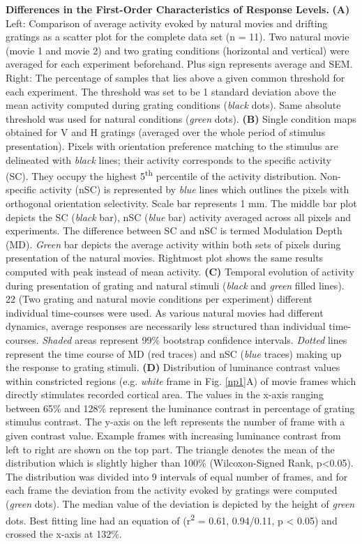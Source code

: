\textbf{Differences in the First-Order Characteristics of Response Levels.}
\textbf{(A)} Left: Comparison of average activity evoked by natural movies
and drifting gratings as a scatter plot for the complete data set (n = 11).
Two natural movie (movie 1 and movie 2) and two grating conditions
(horizontal and vertical) were averaged for each experiment beforehand.
Plus sign represents average and SEM. Right: The percentage of samples that
lies above a given common threshold for each experiment. The threshold was
set to be 1 standard deviation above the mean activity computed during
grating conditions (\textit{black} dots). Same absolute threshold was used
for natural conditions (\textit{green} dots).  \textbf{(B)} Single
condition maps obtained for V and H gratings (averaged over the whole
period of stimulus presentation). Pixels with orientation preference
matching to the stimulus are delineated with \textit{black} lines; their
activity corresponds to the specific activity (SC). They occupy the highest
5\textsuperscript{th} percentile of the activity distribution. Non-specific
activity (nSC) is represented by \textit{blue} lines which outlines the
pixels with orthogonal orientation selectivity. Scale bar represents 1 mm.
The middle bar plot depicts the SC (\textit{black} bar), nSC (\textit{blue}
bar) activity averaged across all pixels and experiments. The difference
between SC and nSC is termed Modulation Depth (MD). \textit{Green} bar
depicts the average activity within both sets of pixels during presentation
of the natural movies. Rightmost plot shows the same results computed with
peak instead of mean activity. \textbf{(C)} Temporal evolution of activity
during presentation of grating and natural stimuli (\textit{black} and
\textit{green} filled lines). 22 (Two grating and natural movie conditions
per experiment) different individual time-courses were used. As various
natural movies had different dynamics, average responses are necessarily
less structured than individual time-courses. \textit{Shaded} areas
represent 99\% bootstrap confidence intervals. \textit{Dotted} lines
represent the time course of MD (red traces) and nSC (\textit{blue} traces)
making up the response to grating stimuli. \textbf{(D)} Distribution of
luminance contrast values within constricted regions (e.g. \textit{white}
frame in Fig. \ref{np1}A) of movie frames which directly stimulates
recorded cortical area. The values in the x-axis ranging between 65\% and
128\% represent the luminance contrast in percentage of grating stimulus
contrast. The y-axis on the left represents the number of frame with a
given contrast value. Example frames with increasing luminance contrast
from left to right are shown on the top part. The triangle denotes the mean
of the distribution which is slightly higher than 100\% (Wilcoxon-Signed
Rank, p\textless0.05). The distribution was divided into 9 intervals of
equal number of frames, and for each frame the deviation from the activity
evoked by gratings were computed (\textit{green} dots). The median value of
the deviation is depicted by the height of \textit{green} dots. Best
fitting line had an equation of (r\textsuperscript{2} = 0.61, 0.94/0.11, p
< 0.05) and crossed the x-axis at 132\%. 


